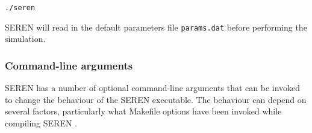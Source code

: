 \documentclass[a4paper]{article}
\newcommand{\NAME}{SEREN }
\newcommand{\var}[1]{\texttt{#1}}
\begin{document}
\var{./seren} \newline

\noindent \NAME will read in the default parameters file \var{params.dat} before performing the simulation.




\subsubsection{Command-line arguments}
\NAME has a number of optional command-line arguments that can be invoked to change the behaviour of the \NAME executable.  The behaviour can depend on several factors, particularly what Makefile options have been invoked while compiling \NAME.
\end{document}
